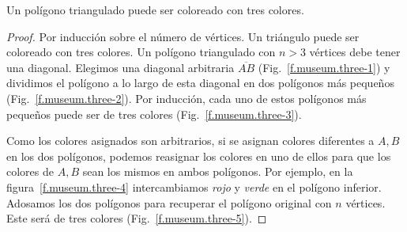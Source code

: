 \begin{theorem}
Un polígono triangulado puede ser coloreado con tres colores.\label{thm.colored}
\end{theorem}

\begin{proof}
Por inducción sobre el número de vértices. Un triángulo puede ser coloreado con tres colores. Un polígono triangulado con $n>3$ vértices debe tener una diagonal. Elegimos una diagonal arbitraria $\overline{AB}$ (Fig.~\ref{f.museum.three-1}) y dividimos el polígono a lo largo de esta diagonal en dos polígonos más pequeños (Fig.~\ref{f.museum.three-2}). Por inducción, cada uno de estos polígonos más pequeños puede ser de tres colores (Fig.~\ref{f.museum.three-3}).

Como los colores asignados son arbitrarios, si se asignan colores diferentes a $A,B$ en los dos polígonos, podemos reasignar los colores en uno de ellos para que los colores de $A,B$ sean los mismos en ambos polígonos. Por ejemplo, en la figura~\ref{f.museum.three-4} intercambiamos \emph{rojo} y \emph{verde} en el polígono inferior.
Adosamos los dos polígonos para recuperar el polígono original con $ n $ vértices. Este será de tres colores (Fig.~\ref{f.museum.three-5}).
\end{proof}

